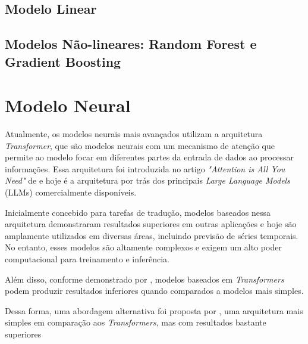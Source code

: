 \subsection{Modelo Linear}

\subsection{Modelos Não-lineares: Random Forest e Gradient Boosting}

\section{Modelo Neural}
Atualmente, os modelos neurais mais avançados utilizam a arquitetura \textit{Transformer}, que são modelos neurais com um
mecanismo de atenção que permite ao modelo focar em diferentes partes da entrada de dados ao processar informações. Essa
arquitetura foi introduzida no artigo \textit{"Attention is All You Need"} de  e hoje é a arquitetura
por trás dos principais \textit{Large Language Models} (LLMs) comercialmente disponíveis.

Inicialmente concebido para tarefas de tradução, modelos baseados nessa arquitetura demonstraram resultados superiores
em outras aplicações e hoje são amplamente utilizados em diversas áreas, incluindo previsão de séries temporais. No entanto,
esses modelos são altamente complexos e exigem um alto poder computacional para treinamento e inferência.

Além disso, conforme demonstrado por , modelos baseados em \textit{Transformers} podem produzir
resultados inferiores quando comparados a modelos mais simples. 

Dessa forma, uma abordagem alternativa foi proposta por , uma arquitetura mais simples em comparação
aos \textit{Transformers}, mas com resultados bastante superiores